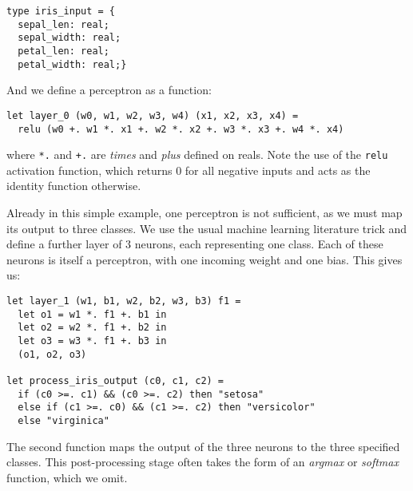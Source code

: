 \documentclass[runningheads]{llncs}
\begin{document}
\begin{lstlisting}[language=caml]
type iris_input = {
  sepal_len: real;
  sepal_width: real;
  petal_len: real;
  petal_width: real;}
\end{lstlisting}

\begin{comment}
To process inputs of this type in the future, we can simply define

\begin{lstlisting}[language=caml]
let process_iris_input (x: iris_input) =
  let x0 = x.sepal_len in
  let x1 = x.sepal_width in
  let x2 = x.petal_len in
  let x3 = x.petal_width in
  (x1, x2, x3, x4)
\end{lstlisting}
\end{comment}

And we define a perceptron as a function:

\begin{lstlisting}[language=caml]
let layer_0 (w0, w1, w2, w3, w4) (x1, x2, x3, x4) =
  relu (w0 +. w1 *. x1 +. w2 *. x2 +. w3 *. x3 +. w4 *. x4)
\end{lstlisting}
where \lstinline{*.} and   \lstinline{+.} are \emph{times} and \emph{plus} defined on reals.  Note the use of the \lstinline{relu} activation function, which returns $0$ for all negative inputs and acts as the identity function otherwise.

Already in this simple example, one perceptron is not sufficient, as we must map its output to three classes. We use the usual machine learning literature trick and define a further layer of $3$ neurons, each representing one class. Each of these neurons is itself a perceptron, with one incoming weight and one bias. This gives us:

\begin{lstlisting}[language=caml]
let layer_1 (w1, b1, w2, b2, w3, b3) f1 =
  let o1 = w1 *. f1 +. b1 in
  let o2 = w2 *. f1 +. b2 in
  let o3 = w3 *. f1 +. b3 in
  (o1, o2, o3)

let process_iris_output (c0, c1, c2) =
  if (c0 >=. c1) && (c0 >=. c2) then "setosa"
  else if (c1 >=. c0) && (c1 >=. c2) then "versicolor"
  else "virginica"
\end{lstlisting}

\noindent The second function maps the output of the three neurons to the three specified classes. This post-processing stage often takes the
form of an \emph{argmax} or \emph{softmax} function, which we omit. %
\end{document}
